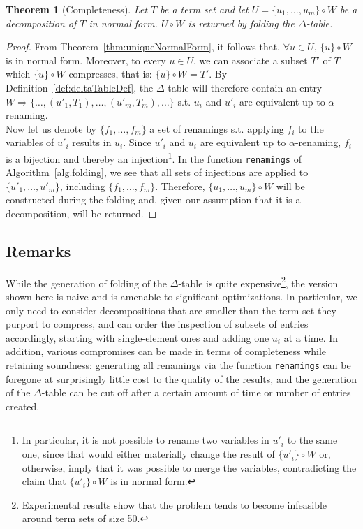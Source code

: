 \documentclass[a4paper, 11pt]{report}
\newtheorem{theorem}{Theorem}
\begin{document}
\begin{theorem}[Completeness]
\label{theo.decompositionCompleteness}
Let $T$ be a term set and let $U = \{u_1,\dots,u_m\} \circ W$ be a decomposition of $T$ in normal form.
$U \circ W$ is returned by folding the $\Delta$-table.
\end{theorem}

\begin{proof}
From Theorem~\ref{thm:uniqueNormalForm}, it follows that, $\forall u \in U$, $\{u\} \circ W$ is in normal form. Moreover, to every $u \in U$, we can associate
a subset $T'$ of $T$ which $\{u\} \circ W$ compresses, that is: $\{u\} \circ W = T'$. By Definition~\ref{def:deltaTableDef}, the $\Delta$-table will therefore contain an
entry $W \Rightarrow \{\dots, (u'_1,T_1),\dots,(u'_m,T_m) ,\dots\}$ s.t. $u_i$ and $u'_i$ are equivalent up to $\alpha$-renaming.\\

Now let us denote by $\{f_1,\dots,f_m\}$ a set of renamings s.t. applying $f_i$ to the variables of $u'_i$ results in $u_i$. Since $u'_i$ and $u_i$ are equivalent up to $\alpha$-renaming, $f_i$ is a bijection and thereby an injection\footnote{In particular, it is not possible to rename two variables in $u'_i$ to the same one, since that would either materially change the result of $\{u'_i\} \circ W$ or, otherwise, imply that it was possible to merge the variables, contradicting the claim that $\{u'_i\} \circ W$ is in normal form.}. In the function \texttt{renamings} of Algorithm~\ref{alg.folding}, we see that all sets of injections are applied to $\{u'_1,\dots,u'_m\}$, including $\{f_1,\dots,f_m\}$. Therefore, $\{u_1,\dots,u_m\} \circ W$ will be constructed during the folding and, given our assumption that it is a decomposition, will be returned.
\end{proof}

\subsection{Remarks}

While the generation of folding of the $\Delta$-table is quite expensive\footnote{Experimental results show that the problem tends to become infeasible around term sets of size 50.}, the version shown here is naive and is amenable to significant optimizations. In particular, we only need to consider decompositions that are smaller than the term set they purport to compress, and can order the inspection of subsets of entries accordingly, starting with single-element ones and adding one $u_i$ at a time. In addition, various compromises can be made in terms of completeness while retaining soundness: generating all renamings via the function \texttt{renamings} can be foregone at surprisingly little cost to the quality of the results, and the generation of the $\Delta$-table can be cut off after a certain amount of time or number of entries created.\\
\end{document}
